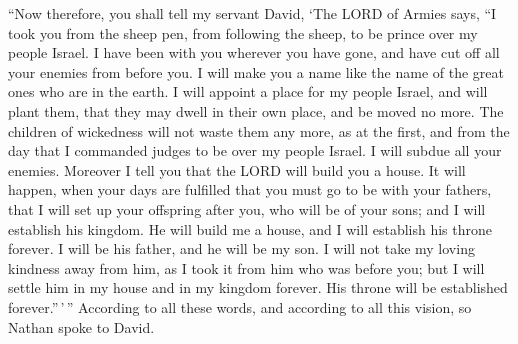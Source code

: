  ``Now therefore, you shall tell my servant David, `The LORD
of Armies says, ``I took you from the sheep pen, from following the
sheep, to be prince over my people Israel.  I have been with
you wherever you have gone, and have cut off all your enemies from
before you. I will make you a name like the name of the great ones who
are in the earth.  I will appoint a place for my people
Israel, and will plant them, that they may dwell in their own place, and
be moved no more. The children of wickedness will not waste them any
more, as at the first,  and from the day that I commanded
judges to be over my people Israel. I will subdue all your enemies.
Moreover I tell you that the LORD will build you a house. 
It will happen, when your days are fulfilled that you must go to be with
your fathers, that I will set up your offspring after you, who will be
of your sons; and I will establish his kingdom.  He will
build me a house, and I will establish his throne forever. 
I will be his father, and he will be my son. I will not take my loving
kindness away from him, as I took it from him who was before you;
 but I will settle him in my house and in my kingdom
forever. His throne will be established forever.''\,'\,'' 
According to all these words, and according to all this vision, so
Nathan spoke to David.

